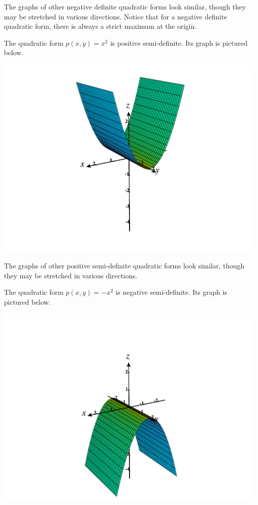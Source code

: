 \documentclass{ximera}
\begin{document}
\begin{example}
The graphs of other negative definite quadratic forms look similar, though they may be stretched in various directions. Notice that for a negative definite quadratic form, there is always a strict maximum at the origin.

The quadratic form $p(x,y) = x^2$ is positive semi-definite. Its graph is pictured below.

\begin{image}
\includegraphics[width=\textwidth]{CalcPlot3D-pos_semidef}
\end{image}

The graphs of other positive semi-definite quadratic forms look similar, though they may be stretched in various directions. 

The quadratic form $p(x,y) = -x^2$ is negative semi-definite. Its graph is pictured below.

\begin{image}
\includegraphics[width=\textwidth]{CalcPlot3D-neg_semidef}
\end{image}


\end{example}
\end{document}
